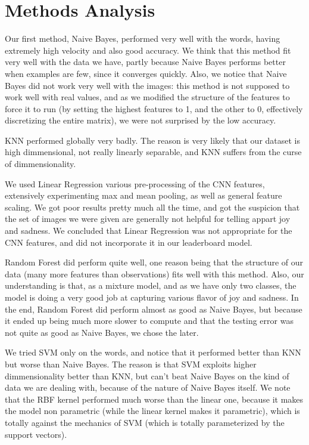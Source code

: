 \documentclass[11pt,twocolumn]{report}
\begin{document}
\section *{Methods Analysis}

    Our first method, Naive Bayes, performed very well with the words, having extremely high velocity and also good accuracy. We think that this method fit very well with the data we have, partly because Naive Bayes performs better when examples are few, since it converges quickly. Also, we notice that Naive Bayes did not work very well with the images: this method is not supposed to work well with real values, and as we modified the structure of the features to force it to run (by setting the highest features to 1, and the other to 0, effectively discretizing the entire matrix), we were not surprised by the low accuracy.
    \par
    KNN performed globally very badly. The reason is very likely that our dataset is high dimmensional, not really linearly separable, and KNN suffers from the curse of dimmensionality.
    \par
    We used Linear Regression various pre-processing of the CNN features, extensively experimenting max and mean pooling, as well as general feature scaling. We got poor results pretty much all the time, and got the suspicion that the set of images we were given are generally not helpful for telling appart joy and sadness. We concluded that Linear Regression was not appropriate for the CNN features, and did not incorporate it in our leaderboard model.
    \par
    Random Forest did perform quite well, one reason being that the structure of our data (many more features than observations) fits well with this method. Also, our understanding is that, as a mixture model, and as we have only two classes, the model is doing a very good job at capturing various flavor of joy and sadness. In the end, Random Forest did perform almost as good as Naive Bayes, but because it ended up being much more slower to compute and that the testing error was not quite as good as Naive Bayes, we chose the later.
    \par
    We tried SVM only on the words, and notice that it performed better than KNN but worse than Naive Bayes. The reason is that SVM exploits higher dimmensionality better than KNN, but can't beat Naive Bayes on the kind of data we are dealing with, because of the nature of Naive Bayes itself. We note that the RBF kernel performed much worse than the linear one, because it makes the model non parametric (while the linear kernel makes it parametric), which is totally against the mechanics of SVM (which is totally parameterized by the support vectors).
\end{document}
